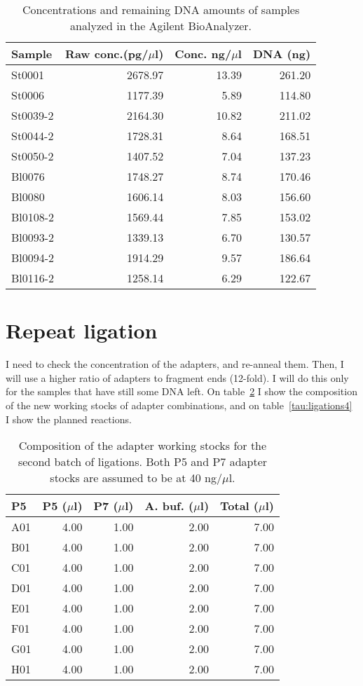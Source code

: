 \documentclass[a4paper,12pt,twosided]{article}
\begin{document}
\begin{table}
\begin{center}
\caption{Concentrations and remaining DNA amounts of samples analyzed in the Agilent BioAnalyzer.}\label{tau:ligationBioanalyzer}
\vspace*{0.2cm}
\begin{tabular}{lrrr}
\toprule
Sample&Raw conc.(pg/$\mu$l)&Conc. ng/$\mu$l&DNA (ng)\\
\midrule
St0001&2678.97&13.39&261.20\\
St0006&1177.39&5.89&114.80\\
St0039-2&2164.30&10.82&211.02\\
St0044-2&1728.31&8.64&168.51\\
St0050-2&1407.52&7.04&137.23\\
Bl0076&1748.27&8.74&170.46\\
Bl0080&1606.14&8.03&156.60\\
Bl0108-2&1569.44&7.85&153.02\\
Bl0093-2&1339.13&6.70&130.57\\
Bl0094-2&1914.29&9.57&186.64\\
Bl0116-2&1258.14&6.29&122.67\\
\bottomrule
\end{tabular}
\end{center}
\end{table}

\section{Repeat ligation}
I need to check the concentration of the adapters, and re-anneal them. Then, I will use a higher ratio of adapters to fragment ends (12-fold). I will do this only for the samples that have still some DNA left. On table~\ref{tau:lig2stocks} I show the composition of the new working stocks of adapter combinations, and on table~\ref{tau:ligations4} I show the planned reactions.

\begin{table}
\begin{center}
\caption{Composition of the adapter working stocks for the second batch of ligations. Both P5 and P7 adapter stocks are assumed to be at 40 ng/$\mu$l.}\label{tau:lig2stocks}
\vspace*{0.2cm}
\begin{tabular}{lrrrr}
\toprule
P5&P5 ($\mu$l)&P7 ($\mu$l)&A. buf. ($\mu$l)&Total ($\mu$l)\\
\midrule
A01&4.00&1.00&2.00&7.00\\
B01&4.00&1.00&2.00&7.00\\
C01&4.00&1.00&2.00&7.00\\
D01&4.00&1.00&2.00&7.00\\
E01&4.00&1.00&2.00&7.00\\
F01&4.00&1.00&2.00&7.00\\
G01&4.00&1.00&2.00&7.00\\
H01&4.00&1.00&2.00&7.00\\
\bottomrule
\end{tabular}
\end{center}
\end{table}
\end{document}
